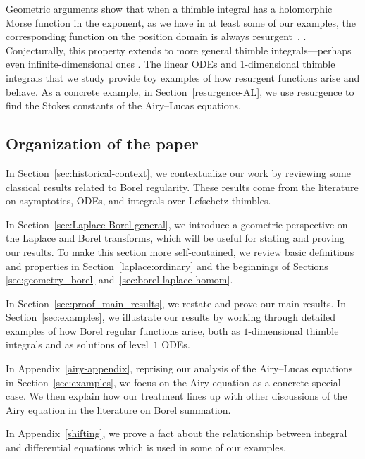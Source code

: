 \documentclass[10pt,a4paper]{amsart}
\numberwithin{equation}{section}
\begin{document}
Geometric arguments show that when a thimble integral has a holomorphic Morse function in the exponent, as we have in at least some of our examples, the corresponding function on the position domain is always resurgent~\cite{Maxim_slide_ERC}, \cite[Section~6.2]{kontsevich2022analyticity}. Conjecturally, this property extends to more general thimble integrals---perhaps even infinite-dimensional ones \cite[Examples~5--6]{Maxim_slide_ERC}. The linear ODEs and $1$-dimensional thimble integrals that we study provide toy examples of how resurgent functions arise and behave. As a concrete example, in Section~\ref{resurgence-AL}, we use resurgence to find the Stokes constants of the Airy--Lucas equations.
%
\subsection{Organization of the paper}\label{sec:org}
%
In Section~\ref{sec:historical-context}, we contextualize our work by reviewing some classical results related to Borel regularity. These results come from the literature on asymptotics, ODEs, and integrals over Lefschetz thimbles.

In Section~\ref{sec:Laplace-Borel-general}, we introduce a geometric perspective on the Laplace and Borel transforms, which will be useful for stating and proving our results. To make this section more self-contained, we review basic definitions and properties in Section~\ref{laplace:ordinary} and the beginnings of Sections \ref{sec:geometry_borel} and~\ref{sec:borel-laplace-homom}.

In Section~\ref{sec:proof_main_results}, we restate and prove our main results. In Section~\ref{sec:examples}, we illustrate our results by working through detailed examples of how Borel regular functions arise, both as $1$-dimensional thimble integrals and as solutions of level~$1$ ODEs.

In Appendix~\ref{airy-appendix}, reprising our analysis of the Airy--Lucas equations in Section~\ref{sec:examples}, we focus on the Airy equation as a concrete special case. We then explain how our treatment lines up with other discussions of the Airy equation in the literature on Borel summation.

In Appendix~\ref{shifting}, we prove a fact about the relationship between integral and differential equations which is used in some of our examples.
\end{document}
